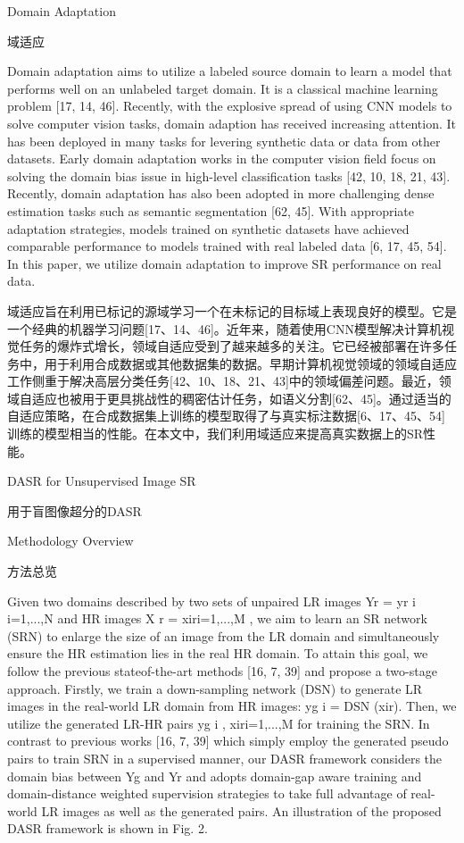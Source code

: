 Domain Adaptation

域适应

Domain adaptation aims to utilize a labeled source domain to learn a model that performs well on an unlabeled target domain. It is a classical machine learning problem [17, 14, 46]. Recently, with the explosive spread of using CNN models to solve computer vision tasks, domain adaption has received increasing attention. It has been deployed in many tasks for levering synthetic data or data from other datasets. Early domain adaptation works in the computer vision field focus on solving the domain bias issue in high-level classification tasks [42, 10, 18, 21, 43]. Recently, domain adaptation has also been adopted in more challenging dense estimation tasks such as semantic segmentation [62, 45]. With appropriate adaptation strategies, models trained on synthetic datasets have achieved comparable performance to models trained with real labeled data [6, 17, 45, 54]. In this paper, we utilize domain adaptation to improve SR performance on real data.

域适应旨在利用已标记的源域学习一个在未标记的目标域上表现良好的模型。它是一个经典的机器学习问题[17、14、46]。近年来，随着使用CNN模型解决计算机视觉任务的爆炸式增长，领域自适应受到了越来越多的关注。它已经被部署在许多任务中，用于利用合成数据或其他数据集的数据。早期计算机视觉领域的领域自适应工作侧重于解决高层分类任务[42、10、18、21、43]中的领域偏差问题。最近，领域自适应也被用于更具挑战性的稠密估计任务，如语义分割[62、45]。通过适当的自适应策略，在合成数据集上训练的模型取得了与真实标注数据[6、17、45、54]训练的模型相当的性能。在本文中，我们利用域适应来提高真实数据上的SR性能。

DASR for Unsupervised Image SR

用于盲图像超分的DASR

Methodology Overview

方法总览

Given two domains described by two sets of unpaired LR images Yr = {yr i }i=1,...,N and HR images X r = {xir}i=1,...,M , we aim to learn an SR network (SRN) to enlarge the size of an image from the LR domain and simultaneously ensure the HR estimation lies in the real HR domain. To attain this goal, we follow the previous stateof-the-art methods [16, 7, 39] and propose a two-stage approach. Firstly, we train a down-sampling network (DSN) to generate LR images in the real-world LR domain from HR images: yg i = DSN (xir). Then, we utilize the generated LR-HR pairs {yg i , xir}i=1,...,M for training the SRN. In contrast to previous works [16, 7, 39] which simply employ the generated pseudo pairs to train SRN in a supervised manner, our DASR framework considers the domain bias between Yg and Yr and adopts domain-gap aware training and domain-distance weighted supervision strategies to take full advantage of real-world LR images as well as the generated pairs. An illustration of the proposed DASR framework is shown in Fig. 2.

